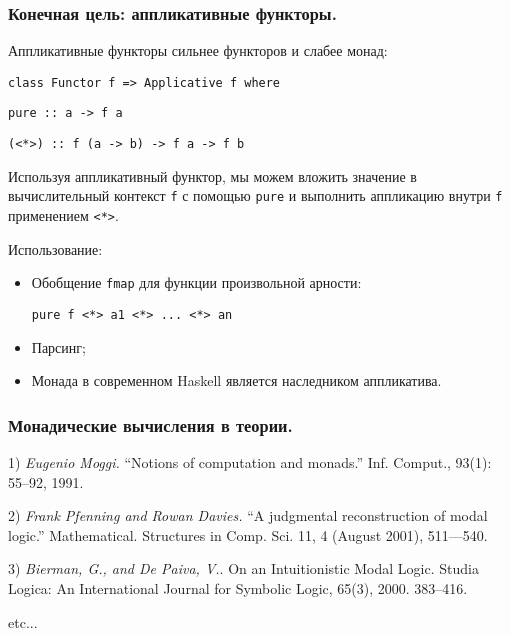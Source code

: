 \documentclass[10pt,pdf,utf8,russian,aspectratio=169]{beamer}
\begin{document}
\begin{frame}
\frametitle{Конечная цель: аппликативные функторы.}


Аппликативные функторы сильнее функторов и слабее монад:

\vspace{\baselineskip}

\verb"class Functor f => Applicative f where"

\quad\quad \verb"pure :: a -> f a"

\quad\quad \verb"(<*>) :: f (a -> b) -> f a -> f b"

\vspace{\baselineskip}

Используя аппликативный функтор, мы можем вложить значение в вычислительный контекст \verb"f" с помощью \verb"pure" и выполнить
аппликацию внутри \verb"f" применением \verb"<*>".

\vspace{\baselineskip}

Использование:
\begin{itemize}
\item Обобщение \verb"fmap" для функции произвольной арности:

\verb"pure f <*> a1 <*> ... <*> an"
\item Парсинг;
\item Монада в современном Haskell является наследником аппликатива.
\end{itemize}
\end{frame}

\begin{frame}
\frametitle{Монадические вычисления в теории.}

1) \emph{Eugenio Moggi.} ``Notions of computation and monads.'' Inf. Comput., 93(1): 55--92, 1991.

\vspace{\baselineskip}

2) \emph{Frank Pfenning and Rowan Davies.}  ``A judgmental reconstruction of modal logic.'' Mathematical. Structures in Comp. Sci. 11, 4 (August 2001), 511---540.

\vspace{\baselineskip}

3) \emph{Bierman, G., and De Paiva, V.}. On an Intuitionistic Modal Logic. Studia Logica: An International Journal for Symbolic Logic, 65(3), 2000. 383--416.

etc...
\end{frame}
\end{document}
